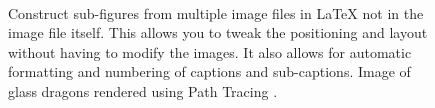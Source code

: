\begin{figure}[H]
	\centering
	
	~ %
	\\ %

	\caption[A demonstration of a 2x1 sub-figure layout.]{Construct sub-figures from multiple image files in LaTeX not in the image file itself. This allows you to tweak the positioning and layout without having to modify the images. It also allows for automatic formatting and numbering of captions and sub-captions. Image of glass dragons rendered using Path Tracing \cite{whittle15_dragons}.}
	
	\label{fig:example_2x1}
	
\end{figure}